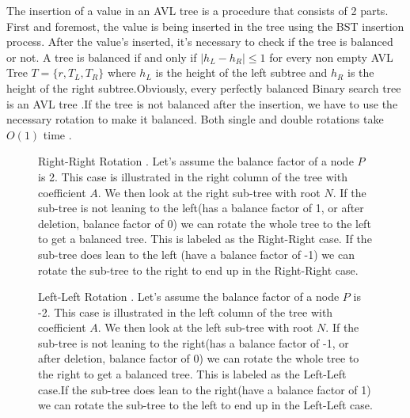 \documentclass[journal,article,submit,moreauthors,algorithms]{Definitions/mdpi}
\begin{document}
The insertion of a value in an AVL tree is a procedure that consists of 2 parts. First and foremost, the value is being inserted in the tree using the BST insertion process. After the value’s inserted, it’s necessary to check if the tree is balanced or not. A tree is balanced if and only if $ |h_L- h_R| \leq 1 $ for every non empty AVL Tree $ T = \{r, T_L, T_R \} $  where $h_L$ is the height of the left subtree and $h_R$ is the height of the right subtree.Obviously, every perfectly balanced Binary search tree is an AVL tree \cite{preiss}.If the tree is not balanced after the insertion, we have to use the necessary rotation to make it balanced. Both single and double rotations take $O(1)$ time \cite{preiss}.




\begin{figure}[H]
\centering

\label{fig:1}
\caption{Right-Right Rotation \cite{siddharth}. Let's assume the balance factor of a node $P$ is 2. This case is illustrated in the right column of the tree with coefficient $A$. We then look at the right sub-tree with root $N$. If the sub-tree is not leaning to the left(has a balance factor of 1, or after deletion, balance factor of 0) we can rotate the whole tree to the left to get a balanced tree. This is labeled as the Right-Right case. If the sub-tree does lean to the left (have a balance factor of -1) we can rotate the sub-tree to the right to end up in the Right-Right case.\\}
\end{figure}



\begin{figure}[H]
\centering

\label{fig:2}
\caption{Left-Left Rotation \cite{siddharth}. Let's assume the balance factor of a node $P$ is -2. This case is illustrated in the left column of the tree with coefficient $A$. We then look at the left sub-tree with root $N$. If the sub-tree is not leaning to the right(has a balance factor of -1, or after deletion, balance factor of 0) we can rotate the whole tree to the right to get a balanced tree. This is labeled as the Left-Left case.If the sub-tree does lean to the right(have a balance factor of 1) we can rotate the sub-tree to the left to end up in the Left-Left case.\\}
\end{figure}



\end{document}
